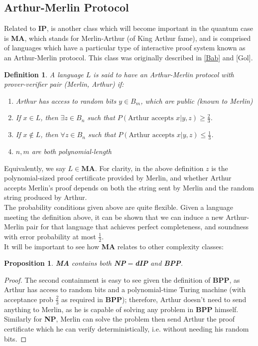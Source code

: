 \documentclass[12pt]{article}
\newtheorem*{defn}{Definition}
\newtheorem*{prop}{Proposition}
\begin{document}
	\subsection{Arthur-Merlin Protocol}
	Related to \textbf{IP}, is another class which will become important in the quantum case is \textbf{MA}, which stands for Merlin-Arthur (of King Arthur fame), and is comprised of languages which have a particular type of interactive proof system known as an Arthur-Merlin protocol. This class was originally described in \hyperref[bab]{[Bab]} and [Gol].
	
	\begin{defn}
		A language $L$ is said to have an Arthur-Merlin protocol with prover-verifier pair (Merlin, Arthur) if:
		\begin{enumerate}
			\item Arthur has access to random bits $y\in B_m$, which are public (known to Merlin)
			\item If $x\in L$, then $\exists z\in B_n$ such that $P(\text{Arthur accepts }x|y,z)\geq \frac{2}{3}$.
			\item If $x\notin L$, then $\forall z\in B_n$ such that $P(\text{Arthur accepts }x|y,z)\leq\frac{1}{3}$. 
			\item $n,m$ are both polynomial-length
		\end{enumerate}
	
	
	\end{defn}
	Equivalently, we say $L\in \textbf{MA}$. For clarity, in the above definition $z$ is the polynomial-sized proof certificate provided by Merlin, and whether Arthur accepts Merlin's proof depends on both the string sent by Merlin and the random string produced by Arthur.\\
	
	The probability conditions given above are quite flexible. Given a language meeting the definition above, it can be shown that we can induce a new Arthur-Merlin pair for that language that achieves perfect completeness, and soundness with error probability at most $\frac{1}{2}$.\\
	
	It will be important to see how \textbf{MA} relates to other complexity classes:
	\begin{prop}\textbf{MA} contains both \textbf{NP}$=$\textbf{dIP} and \textbf{BPP}. \end{prop}
	\begin{proof}The second containment is easy to see given the definition of \textbf{BPP}, as Arthur has access to random bits and a polynomial-time Turing machine (with acceptance prob $\frac{2}{3}$ as required in \textbf{BPP}); therefore, Arthur doesn't need to send anything to Merlin, as he is capable of solving any problem in \textbf{BPP} himself.\\Similarly for \textbf{NP}, Merlin can solve the problem then send Arthur the proof certificate which he can verify deterministically, i.e. without needing his random bits. \end{proof}
	
\end{document}
